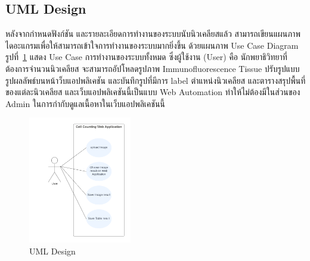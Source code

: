 \documentclass[12pt,oneside,openright,a4paper]{cpe-thai-project}
\begin{document}
\subsection{UML Design}
หลังจากกําหนดฟังก์ชัน และรายละเอียดการทํางานของระบบนับนิวเคลียสแล้ว สามารถเขียนแผนภาพไดอะแกรมเพื่อให้สามารถเข้าใจการทํางานของระบบมากยิ่งขึ้น ด้วยแผนภาพ Use Case Diagram รูปที่~\ref{fig:uml} แสดง Use Case การทํางานของระบบทั้งหมด ซึ่งผู้ใช้งาน (User) คือ นักพยาธิวิทยาที่ต้องการจำนวนนิวเคลียส จะสามารถอัปโหลดรูปภาพ Immunofluorescence Tissue ปรับรูปแบบรูปผลลัพธ์บนหน้าว็บแอปพลิเคชัน และบันทึกรูปที่มีการ label ตำแหน่งนิวเคลียส และตารางสรุปพื้นที่ของแต่ละนิวเคลียส และเว็บแอปพลิเคชันนี้เป็นแบบ Web Automation ทำให้ไม่ต้องมีในส่วนของ Admin ในการกำกับดูแลเนื้อหาในเว็บแอปพลิเคชันนี้  
\begin{figure}[!h]\centering
\includegraphics[width=4.5cm]{images/uml.png}
\captionsetup{justification=centering}
\caption{UML Design}\label{fig:uml}
\end{figure}
\pagebreak
\end{document}
